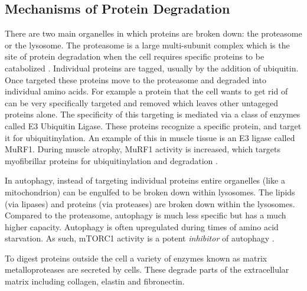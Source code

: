 \documentclass{tufte-handout}
\begin{document}
\subsection{Mechanisms of Protein Degradation}

There are two main organelles in which proteins are broken down: the proteasome or the lysosome.  The proteasome is a large multi-subunit complex which is the site of protein degradation when the cell requires specific proteins to be catabolized \citep{Finley2009}.  Individual proteins are tagged, usually by the addition of ubiquitin. Once targeted these proteins move to the proteasome and degraded into individual amino acids.  For example a protein that the cell wants to get rid of can be very specifically targeted and removed which leaves other untageged proteins alone. The specificity of this targeting is mediated via a class of enzymes called E3 Ubiquitin Ligase.  These proteins recognize a specific protein, and target it for ubiquitinylation. An example of this in muscle tissue is an E3 ligase called MuRF1.  During muscle atrophy, MuRF1 activity is increased, which targets myofibrillar proteins for ubiquitinylation and degradation \citep{Bodine2014}.  

  In autophagy, instead of targeting individual proteins entire organelles (like a mitochondrion) can be engulfed to be broken down within lysosomes.  The lipids (via lipases) and proteins (via proteases) are broken down within the lysosomes.  Compared to the proteasome, autophagy is much less specific but has a much higher capacity.  Autophagy is often upregulated during times of amino acid starvation.  As such, mTORC1 activity is a potent \emph{inhibitor} of autophagy \citep{Noda1998}.

  To digest proteins outside the cell a variety of enzymes known as matrix metalloproteases are secreted by cells.  These degrade parts of the extracellular matrix including collagen, elastin and fibronectin.
\end{document}
